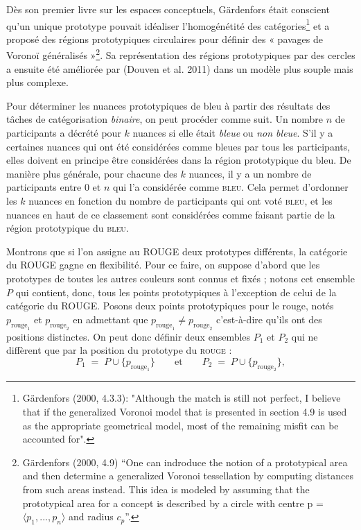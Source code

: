 \documentclass{article}
\begin{document}
Dès son premier livre sur les espaces conceptuels, Gärdenfors était conscient qu’un unique prototype pouvait idéaliser l'homogénétité des catégories\footnote{Gärdenfors (2000, 4.3.3): "Although the match is still not perfect, I believe that if the generalized Voronoi model that is presented in section 4.9 is used as the appropriate geometrical model, most of the remaining misfit can be accounted for".} et a proposé des régions prototypiques circulaires pour définir des « pavages de Voronoï généralisés »\footnote{Gärdenfors (2000, 4.9) “One can indroduce the notion of a prototypical area and then determine a generalized Voronoi tessellation by computing distances from such areas instead. This idea is modeled by assuming that the prototypical area for a concept is described by a circle with centre p = $\langle p_1,... , p_n \rangle$ and radius $c_p$”. }. Sa représentation des régions prototypiques par des cercles a ensuite été améliorée par (Douven et al. 2011) dans un modèle plus souple mais plus complexe.

\par
Pour déterminer les nuances prototypiques de bleu à partir des résultats des tâches de  catégorisation \textit{binaire}, on peut procéder comme suit. Un nombre $n$ de participants a décrété  pour $k$ nuances si elle était \textit{bleue} ou \textit{non bleue}. S'il y a certaines nuances qui ont été considérées  comme bleues par tous les participants, elles doivent en principe être considérées dans la région prototypique du bleu. De manière plus générale, pour chacune des $k$ nuances, il y a un nombre  de participants entre 0 et $n$ qui l'a considérée comme \textsc{bleu}. Cela permet d'ordonner les $k$ nuances en fonction du nombre de participants qui ont voté \textsc{bleu}, et les nuances en haut de ce  classement sont considérées comme faisant partie de la région prototypique du \textsc{bleu}.

\par
Montrons que si l'on assigne au ROUGE deux prototypes différents, la catégorie du ROUGE gagne en flexibilité.
Pour ce faire, on suppose d'abord que les prototypes de toutes les autres couleurs sont connus et fixés ; notons cet ensemble  \(P\) qui contient, donc, tous les points prototypiques à l'exception de celui de la catégorie du ROUGE. Posons deux points prototypiques pour le rouge, notés $p_{\text{rouge}_1}$ et $ p_{\text{rouge}_2}$ en admettant que \(p_{\text{rouge}_1}\neq p_{\text{rouge}_2}\) c'est-à-dire qu'ils ont des positions distinctes. On peut donc définir deux ensembles $P_1$ et $P_2$ qui ne diffèrent que par la position du prototype du \textsc{rouge} :
\[
P_1 \;=\; P \cup \{p_{\text{rouge}_1}\}
\qquad\text{et}\qquad
P_2 \;=\; P \cup \{p_{\text{rouge}_2}\},
\]
\end{document}

